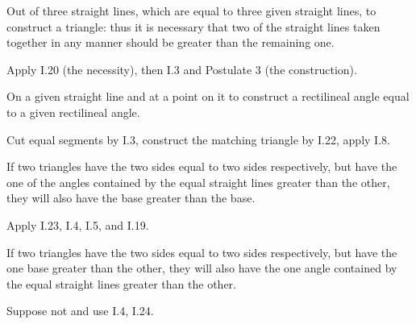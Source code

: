 \documentclass{rrxiv}
\begin{document}
\begin{claim}
\label{prop:I.22}
Out of three straight lines, which are equal to three given straight
lines, to construct a triangle: thus it is necessary that two of the
straight lines taken together in any manner should be greater than the
remaining one.
\end{claim}
\begin{evidence}[Proof of I.22]
\label{ev:I.22}
Apply I.20 (the necessity), then I.3 and Postulate 3 (the
construction).
\end{evidence}

\begin{claim}
\label{prop:I.23}
On a given straight line and at a point on it to construct a
rectilineal angle equal to a given rectilineal angle.
\end{claim}
\begin{evidence}[Proof of I.23]
\label{ev:I.23}
Cut equal segments by I.3, construct the matching triangle by I.22,
apply I.8.
\end{evidence}

\begin{claim}
\label{prop:I.24}
If two triangles have the two sides equal to two sides respectively,
but have the one of the angles contained by the equal straight lines
greater than the other, they will also have the base greater than the
base.
\end{claim}
\begin{evidence}[Proof of I.24]
\label{ev:I.24}
Apply I.23, I.4, I.5, and I.19.
\end{evidence}

\begin{claim}
\label{prop:I.25}
If two triangles have the two sides equal to two sides respectively,
but have the one base greater than the other, they will also have the
one angle contained by the equal straight lines greater than the
other.
\end{claim}
\begin{evidence}[Proof of I.25]
\label{ev:I.25}
Suppose not and use I.4, I.24.
\end{evidence}
\end{document}
